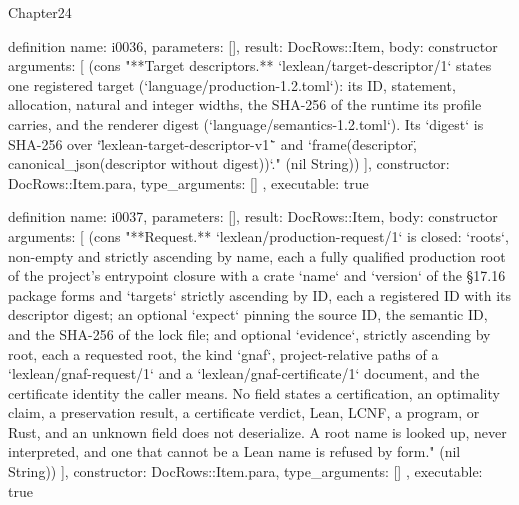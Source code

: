 \begin{lexlean}{Chapter24}
\begin{semanticmodule}
definition{
  name: i0036,
  parameters: [],
  result: DocRows::Item,
  body: constructor{
    arguments: [
      (cons "**Target descriptors.** `lexlean/target-descriptor/1` states one registered target (`language/production-1.2.toml`): its ID, statement, allocation, natural and integer widths, the SHA-256 of the runtime its profile carries, and the renderer digest (`language/semantics-1.2.toml`). Its `digest` is SHA-256 over `\"lexlean-target-descriptor-v1\"` and `frame(\"descriptor\", canonical_json(descriptor without digest))`." (nil String))
    ],
    constructor: DocRows::Item.para,
    type_arguments: []
  },
  executable: true
}

definition{
  name: i0037,
  parameters: [],
  result: DocRows::Item,
  body: constructor{
    arguments: [
      (cons "**Request.** `lexlean/production-request/1` is closed: `roots`, non-empty and strictly ascending by name, each a fully qualified production root of the project's entrypoint closure with a crate `name` and `version` of the §17.16 package forms and `targets` strictly ascending by ID, each a registered ID with its descriptor digest; an optional `expect` pinning the source ID, the semantic ID, and the SHA-256 of the lock file; and optional `evidence`, strictly ascending by root, each a requested root, the kind `gnaf`, project-relative paths of a `lexlean/gnaf-request/1` and a `lexlean/gnaf-certificate/1` document, and the certificate identity the caller means. No field states a certification, an optimality claim, a preservation result, a certificate verdict, Lean, LCNF, a program, or Rust, and an unknown field does not deserialize. A root name is looked up, never interpreted, and one that cannot be a Lean name is refused by form." (nil String))
    ],
    constructor: DocRows::Item.para,
    type_arguments: []
  },
  executable: true
}


\end{semanticmodule}
\end{lexlean}
